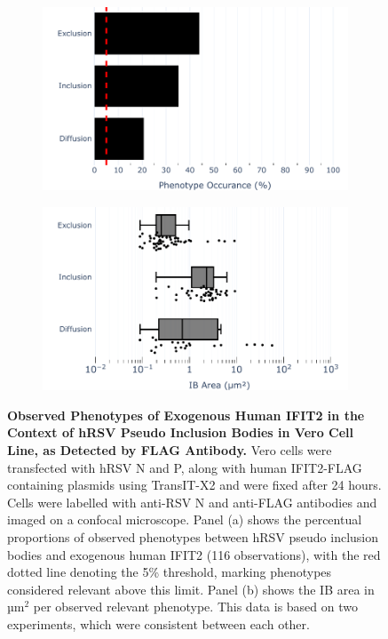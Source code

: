\begin{figure}
    \begin{subfigure}{0.495\textwidth}
        \caption{}
        \includegraphics[width=1\linewidth]{09. Chapter 4/Figs/01. pIB/03. IFIT2/04. IFIT2-FLAG/03. FLAG/01. bar_hi2f_hnhp.pdf}
    \end{subfigure}
    \begin{subfigure}{0.495\textwidth}
        \caption{}
        \includegraphics[width=1\linewidth]{09. Chapter 4/Figs/01. pIB/03. IFIT2/04. IFIT2-FLAG/03. FLAG/02. box_hi2f_hnhp.pdf}
    \end{subfigure}
    \caption[Observed Phenotypes of Exogenous Human IFIT2 in the Context of hRSV Pseudo Inclusion Bodies in Vero Cell Line, as Detected by FLAG Antibody.]{\textbf{Observed Phenotypes of Exogenous Human IFIT2 in the Context of hRSV Pseudo Inclusion Bodies in Vero Cell Line, as Detected by FLAG Antibody.} Vero cells were transfected with hRSV N and P, along with human IFIT2-FLAG containing plasmids using TransIT-X2 and were fixed after 24 hours. Cells were labelled with anti-RSV N and anti-FLAG antibodies and imaged on a confocal microscope. Panel (a) shows the percentual proportions of observed phenotypes between hRSV pseudo inclusion bodies and exogenous human IFIT2 (116 observations), with the red dotted line denoting the 5\% threshold, marking phenotypes considered relevant above this limit. Panel (b) shows the IB area in \(\mbox{µm}^2\) per observed relevant phenotype. This data is based on two experiments, which were consistent between each other.}
    \label{fig:Observed Phenotypes of Exogenous Human IFIT2 in the Context of hRSV Pseudo Inclusion Bodies in Vero Cell Line, as Detected by FLAG Antibody}
\end{figure}


